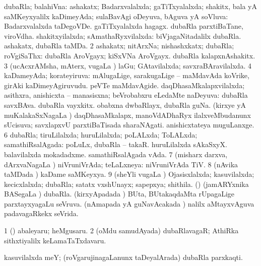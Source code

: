 \bentry
{} 
\gl{\gu}
\expl{}
\bmng
\bnum
{} 
\banum
{} dubaRla; balahiVna: ashakatx; Badarxvalalxda; gaTiTxyalalxda; shakitx, bala yA saMKeyxyalilx kaDimeyAda; sulaBavAgi oDeyuva, bAguva yA soVluva:  Badarxvalalxda taDegoVDe.  gaTiTxyalalxda hagagx.  dubaRla parxtiBaTane, viroVdha. 
 shakitxyilalxda; sAmathaRyxvilalxda:  biVjagaNitadalilx dubaRla.  ashakatx, dubaRla taMDa. 
\eanum
\numie
\num{2} ashakatx; nitArxNa; nishashxkatx; dubaRla; roVgiSaThx:  dubaRla AroVgayx; kiSxVNa AroVgayx.  dubaRla kalapxnAshakitx. 
\num{3} (ucAcxrAMsha, mAterx, \mo vugaLa \vi) laGu; GAtavilalxda; savxraBAravilalxda. 
\num{4} kaDameyAda; korateyiruva:  mAlugaLige, sarakugaLige -- maMdavAda koVrike, girAki kaDimeyAgiruvudu.  peVTe maMdavAgide. 
\banum
{} daqDhasaMkalapxvilalxda; asithxra, anishicxta -- manasisxna; beVrobabxru eLedaMte naDeyuva:  dubaRla savxBAva.  dubaRla vayxkitx.  obabxna dwbaRlayx, dubaRla guNa. 
 (kirxye yA muKalakaSxNagaLa \vi) daqDhasaMkalapx, manoVdADhaRyx ilalxveMbudanunx sUcisuva;  savxlapxvU parxtiBaTisada sharaNAgati.  anishicxtateya muguLanxge. 
\eanum
\numie
\num{6} dubaRla; tiruLilalxda; huruLilalxda; poLALxda; ToLALxda; samathiRsalAgada:  poLuLx, dubaRla -- takaR.  huruLilalxda sAkaSxyX.  balavilalxda mokadadxme.  samathiRsalAgada vAda. 
\num{7} (misharx darxva, dArxvaNagaLa \vi) niVruniVrAda; teLaLxneya:  niVruniVrAda TiV. 
\num{8} (nAvika taMDada \vi) kaDame saMKeyxya. 
\num{9} (sheYli \mo vugaLa \vi) Ojasisxlalxda; kasuvilalxda; kecicxlalxda; dubaRla; satatx vxshUnayx; sapepxya; shithila. 
 (\vAyx) (jamARYxnika BASegaLa \vi) dubaRla. 
\banum
{} (kirxyApadada \vi) BUta, BUtakaqdaMta rUpagaLige  parxtayxyagaLu seVruva. 
 (nAmapada yA guNavAcakada \vi)  nalilx aMtayxvAguva padavagaRkekx seVrida. 
\eanum
\numie
\enum
\emng

\noindent 
\gl{\pagu}
\expl{}
\bmng
\bnum
\num{1}  (\hiV) abaleyaru; heMgusaru. 
\num{2}  (oMdu samudAyada) dubaRlavagaR; AthiRka sithxtiyalilx keLamaTaTxdavaru. 
\enum
\emng
\eentry

\bentry
{} 
\gl{\nA}
\expl{}
\bmng
kasuvilalxda meY; (roVgarujinagaLanunx taDeyalArada) dubaRla parxkaqti. 
\emng
\eentry

